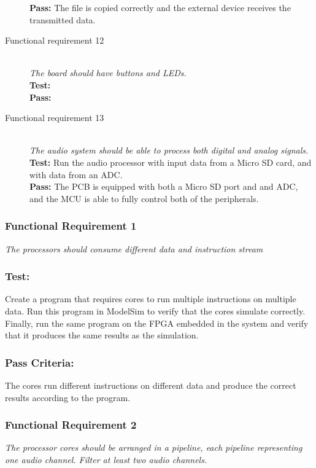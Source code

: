 \begin{description}
        \textbf{Pass:} The file is copied correctly and the external device receives the 
        transmitted data. \\
    \item[Functional requirement 12] \hfill \\
        \textit{The board should have buttons and LEDs.} \\
        \textbf{Test:} \\
        \textbf{Pass:} \\
    \item[Functional requirement 13] \hfill \\
        \textit{The audio system should be able to process both digital and analog signals.} \\
        \textbf{Test:} Run the audio processor with input data from a Micro SD card, and
        with data from an ADC. \\
        \textbf{Pass:} The PCB is equipped with both a Micro SD port and and ADC, and the
        MCU is able to fully control both of the peripherals.\\
\end{description}


\subsubsection*{Functional Requirement 1}
\textit{The processors should consume different data and instruction stream}
\subsubsection*{Test:}
Create a program that requires cores to run multiple instructions on multiple data. 
Run this program in ModelSim to verify that the cores simulate correctly. 
Finally, run the same program on the FPGA embedded in the system and verify that it produces the same results as the simulation.
\subsubsection*{Pass Criteria:}
The cores run different instructions on different data and produce the correct results according to the program. 


\subsubsection*{Functional Requirement 2}
\textit{The processor cores should be arranged in a pipeline, each pipeline representing one audio channel. Filter at least two audio channels.}
